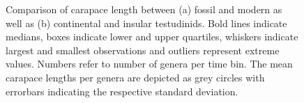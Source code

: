 \begin{center}
	\begin{figure}[htbp]
		\caption[Comparing carapace lengths between fossil/modern and continental/insular testudinids]{Comparison of carapace length between (a) fossil and modern as well as (b) continental and insular testudinids. Bold lines indicate medians, boxes indicate lower and upper quartiles, whiskers indicate largest and smallest observations and outliers represent extreme values. Numbers refer to number of genera per time bin. The mean carapace lengths per genera are depicted as grey circles with errorbars indicating the respective standard deviation.}
		\label{fig:boxFMCI}
	\end{figure}
\end{center}





